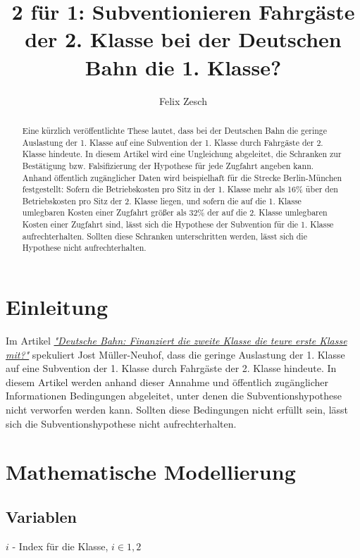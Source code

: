 \documentclass[a4paper,12pt]{article}
\title{2 für 1: Subventionieren Fahrgäste der 2. Klasse bei der Deutschen Bahn die 1. Klasse?}
\author{Felix Zesch}
\begin{document}
\maketitle

\begin{abstract}
Eine kürzlich veröffentlichte These lautet, dass bei der Deutschen Bahn die geringe Auslastung der 1. Klasse auf eine Subvention der 1. Klasse durch Fahrgäste der 2. Klasse hindeute. In diesem Artikel wird eine Ungleichung abgeleitet, die Schranken zur Bestätigung bzw. Falsifizierung der Hypothese für jede Zugfahrt angeben kann. Anhand öffentlich zugänglicher Daten wird beispielhaft für die Strecke Berlin-München festgestellt: Sofern die Betriebskosten pro Sitz in der 1. Klasse mehr als 16\% über den Betriebskosten pro Sitz der 2. Klasse liegen, und sofern die auf die 1. Klasse umlegbaren Kosten einer Zugfahrt größer als 32\% der auf die 2. Klasse umlegbaren Kosten einer Zugfahrt sind, lässt sich die Hypothese der Subvention für die 1. Klasse aufrechterhalten. Sollten diese Schranken unterschritten werden, lässt sich die Hypothese nicht aufrechterhalten.
\end{abstract}

\section{Einleitung}
Im Artikel \href{http://www.tagesspiegel.de/politik/deutsche-bahn-finanziert-die-zweite-klasse-die-teure-erste-klasse-mit/14756914.html}{\textit{"Deutsche Bahn: Finanziert die zweite Klasse die teure erste Klasse mit?"}} spekuliert Jost Müller-Neuhof, dass die geringe Auslastung der 1. Klasse auf eine Subvention der 1. Klasse durch Fahrgäste der 2. Klasse hindeute. In diesem Artikel werden anhand dieser Annahme und öffentlich zugänglicher Informationen Bedingungen abgeleitet, unter denen die Subventionshypothese nicht verworfen werden kann. Sollten diese Bedingungen nicht erfüllt sein, lässt sich die Subventionshypothese nicht aufrechterhalten.

\section{Mathematische Modellierung}
\subsection{Variablen}

\quad \quad $i$ - Index für die Klasse, $i \in {1,2}$
\end{document}
